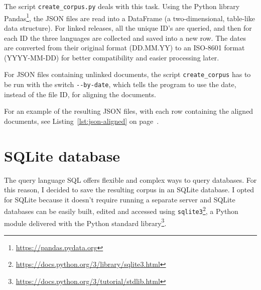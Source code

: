 The script \texttt{create\_corpus.py} deals with this task.
Using the Python library Pandas\footnote{\url{https://pandas.pydata.org}}, the JSON files are read into a DataFrame (a two-dimensional, table-like data structure). 
For linked releases, all the unique ID's are queried, and then for each ID the three languages are collected and saved into a new row. 
The dates are converted from their original format (DD.MM.YY) to an ISO-8601 format (YYYY-MM-DD) \autocite{enwiki:1095673391} for better compatibility and easier processing later.

For JSON files containing unlinked documents, the script \texttt{create\_corpus} has to be run with the switch \texttt{-{}-by-date}, which tells the program to use the date, instead of the file ID, for aligning the documents.

For an example of the resulting \acrshort{JSON} files, with each row containing the aligned documents, see Listing~\ref{lst:json-aligned} on page~\pageref{lst:json-aligned}.




\section{SQLite database}
The query language SQL offers flexible and complex ways to query databases. 
For this reason, I decided to save the resulting corpus in an SQLite database. 
I opted for SQLite because it doesn't require running a separate server and SQLite databases can be easily built, edited and accessed using \texttt{sqlite3}\footnote{\url{https://docs.python.org/3/library/sqlite3.html}}, a Python module delivered with the Python standard library\footnote{\url{https://docs.python.org/3/tutorial/stdlib.html}}.


